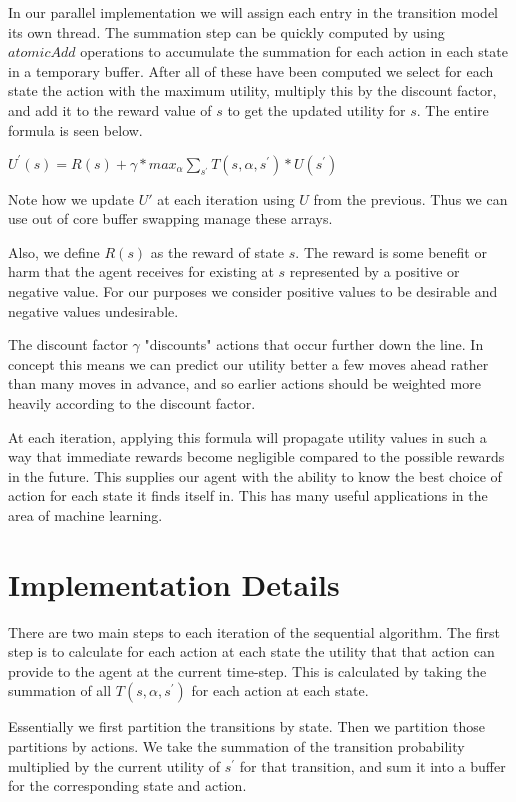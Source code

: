 \documentclass[letterpaper,twocolumn,10pt]{article}
\begin{document}
{In our parallel implementation we will assign each entry in the transition model its own thread. The summation step can be quickly computed by using $atomicAdd$ operations to accumulate the summation for each action in each state in a temporary buffer. After all of these have been computed we select for each state the action with the maximum utility, multiply this by the discount factor, and add it to the reward value of $s$ to get the updated utility for $s$. The entire formula is seen below.

\begin{center}
	$U^\prime(s)=R(s)+\gamma * max_\alpha \sum_{s^\prime}T(s,\alpha,s^\prime)*U(s^\prime)$
\end{center}

Note how we update $U'$ at each iteration using $U$ from the previous. Thus we can use out of core buffer swapping manage these arrays.

Also, we define $R(s)$ as the reward of state $s$. The reward is some benefit or harm that the agent receives for existing at $s$ represented by a positive or negative value. For our purposes we consider positive values to be desirable and negative values undesirable.

The discount factor $\gamma$ "discounts" actions that occur further down the line. In concept this means we can predict our utility better a few moves ahead rather than many moves in advance, and so earlier actions should be weighted more heavily according to the discount factor.

At each iteration, applying this formula will propagate utility values in such a way that immediate rewards become negligible compared to the possible rewards in the future. This supplies our agent with the ability to know the best choice of action for each state it finds itself in. This has many useful applications in the area of machine learning.

\section{Implementation Details}

There are two main steps to each iteration of the sequential algorithm. The first step is to calculate for each action at each state the utility that that action can provide to the agent at the current time-step. This is calculated by taking the summation of all $T(s,\alpha,s^\prime)$ for each action at each state. 

Essentially we first partition the transitions by state. Then we partition those partitions by actions. We take the summation of the transition probability multiplied by the current utility of $s^\prime$ for that transition, and sum it into a buffer for the corresponding state and action.

}
\end{document}

